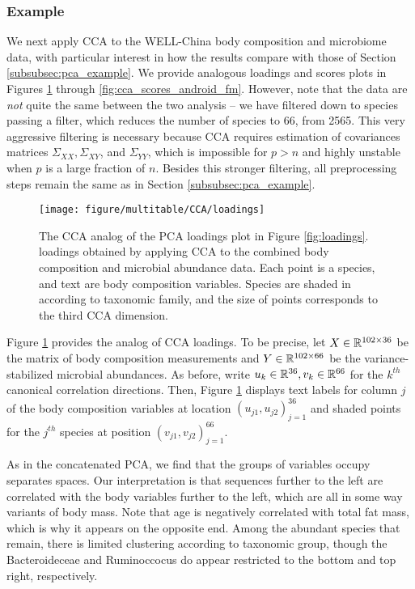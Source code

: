 \documentclass[utf8]{frontiersFPHY} %
\begin{document}
\subsubsection{Example}
\label{subsubsec:cca_example}

We next apply CCA to the WELL-China body composition and microbiome data, with
particular interest in how the results compare with those of Section
\ref{subsubsec:pca_example}. We provide analogous loadings and scores plots in
Figures \ref{fig:cca_loadings} through \ref{fig:cca_scores_android_fm}. However,
note that the data are \textit{not} quite the same between the two analysis --
we have filtered down to species passing a filter, which reduces the number of
species to 66, from 2565. This very aggressive filtering is necessary because
CCA requires estimation of covariances matrices $\Sigma_{XX}, \Sigma_{XY}$, and
$\Sigma_{YY}$, which is impossible for $p > n$ and highly unstable when $p$ is a
large fraction of $n$. Besides this stronger filtering, all preprocessing steps
remain the same as in Section \ref{subsubsec:pca_example}.

\begin{figure}
  \centering \texttt{[image: figure/multitable/CCA/loadings]}
  \caption{The CCA analog of the PCA loadings plot in Figure \ref{fig:loadings}.
    loadings obtained by applying CCA to the combined body composition and
    microbial abundance data. Each point is a species, and text are body
    composition variables. Species are shaded in according to taxonomic family,
    and the size of points corresponds to the third CCA dimension.
      \label{fig:cca_loadings} }
\end{figure}

Figure \ref{fig:cca_loadings} provides the analog of CCA loadings. To be
precise, let $X \in \mathbb{R}^{102\times 36}$ be the matrix of body composition
measurements and $Y \in \mathbb{R}^{102 \times 66}$ be the variance-stabilized
microbial abundances. As before, write $u_{k} \in \mathbb{R}^{36}, v_{k} \in
\mathbb{R}^{66}$ for the $k^{th}$ canonical correlation directions. Then, Figure
\ref{fig:cca_loadings} displays text labels for column $j$ of the body
composition variables at location $\left(u_{j1}, u_{j2}\right)_{j = 1}^{36}$ and
shaded points for the $j^{th}$ species at position $\left(v_{j1},
v_{j2}\right)_{j = 1}^{66}$.

As in the concatenated PCA, we find that the groups of variables occupy
separates spaces. Our interpretation is that sequences further to the left are
correlated with the body variables further to the left, which are all in some
way variants of body mass. Note that age is negatively correlated with total fat
mass, which is why it appears on the opposite end. Among the abundant species
that remain, there is limited clustering according to taxonomic group, though
the Bacteroideceae and Ruminoccocus do appear restricted to the bottom and top
right, respectively.
\end{document}
